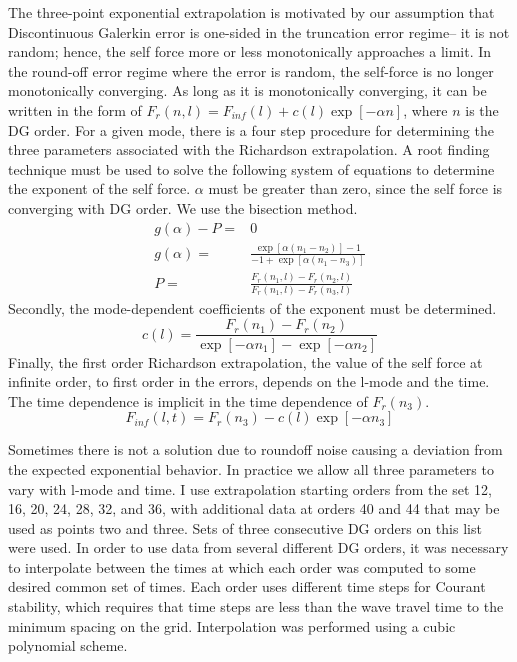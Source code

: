 The three-point exponential extrapolation is motivated by our assumption that Discontinuous Galerkin error is one-sided in the truncation error regime-- it is not random; hence, the self force more or less monotonically approaches a limit. In the round-off error regime where the error is random, the self-force is no longer monotonically converging. As long as it is monotonically converging, it can be written in the form of $F_r(n,l)=F_{inf}(l)+c(l)\exp[-\alpha n]$, where $n$ is the DG order. For a given mode, there is a four step procedure for determining the three parameters associated with the Richardson extrapolation. A root finding technique must be used to solve the following system of equations to determine the exponent of the self force. $\alpha$ must be greater than zero, since the self force is converging with DG order. We use the bisection method. 
\begin{eqnarray}
g(\alpha)-P=&0\\
g(\alpha)=&\frac{\exp[\alpha(n_1-n_2)]-1}{-1+\exp[\alpha(n_1-n_3)]}\\
P=&\frac{F_r(n_1,l)-F_r(n_2,l)}{F_r(n_1,l)-F_r(n_3,l)}
\end{eqnarray}
Secondly, the mode-dependent coefficients of the exponent must be determined.
\begin{equation}
c(l)=\frac{F_r(n_1)-F_r(n_2)}{\exp[-\alpha n_1]-\exp[-\alpha n_2]}
\end{equation}
Finally, the first order Richardson extrapolation, the value of the self force at infinite order, to first order in the errors, depends on the l-mode and the time. The time dependence is implicit in the time dependence of $F_r(n_3)$. 
\begin{equation}
F_{inf}(l,t)=F_r(n_3)-c(l)\exp[-\alpha n_3]
\end{equation}

Sometimes there is not a solution due to roundoff noise causing a deviation from the expected exponential behavior. In practice we allow all three parameters to vary with l-mode and time. I use extrapolation starting orders from the set 12, 16, 20, 24, 28, 32, and 36, with additional data at orders 40 and 44 that may be used as points two and three. Sets of three consecutive DG orders on this list were used. In order to use data from several different DG orders, it was necessary to interpolate between the times at which each order was computed to some desired common set of times. Each order uses different time steps for Courant stability, which requires that time steps are less than the wave travel time to the minimum spacing on the grid. Interpolation was performed using a cubic polynomial scheme. 



